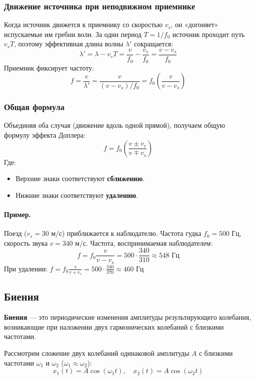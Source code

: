 \subsubsection{Движение источника при неподвижном приемнике}

Когда источник движется к приемнику со скоростью $v_s$, он «догоняет» испускаемые им гребни волн. За один период $T = 1/f_0$ источник проходит путь $v_s T$, поэтому эффективная длина волны $\lambda'$ сокращается:
\[
\lambda' = \lambda - v_s T = \frac{v}{f_0} - \frac{v_s}{f_0} = \frac{v - v_s}{f_0}
\]
Приемник фиксирует частоту:
\[
f = \frac{v}{\lambda'} = \frac{v}{(v - v_s)/f_0} = f_0 \left( \frac{v}{v - v_s} \right)
\]

\subsubsection{Общая формула}
Объединяя оба случая (движение вдоль одной прямой), получаем общую формулу эффекта Доплера:
\[
f = f_0 \left( \frac{v \pm v_r}{v \mp v_s} \right)
\]
Где:
\begin{itemize}
    \item Верхние знаки соответствуют \textbf{сближению}.
    \item Нижние знаки соответствуют \textbf{удалению}.
\end{itemize}

\paragraph*{Пример.}
Поезд (\(v_s = 30\) м/с) приближается к наблюдателю. Частота гудка \(f_0 = 500\) Гц, скорость звука \(v = 340\) м/с. Частота, воспринимаемая наблюдателем:
\[
f = f_0 \frac{v}{v-v_s} = 500 \cdot \frac{340}{310} \approx 548 \text{ Гц}
\]
При удалении: \(f = f_0 \frac{v}{v+v_s} = 500 \cdot \frac{340}{370} \approx 460 \text{ Гц}\)

\subsection{Биения}

\textbf{Биения} — это периодические изменения амплитуды результирующего колебания, возникающие при наложении двух гармонических колебаний с близкими частотами.

Рассмотрим сложение двух колебаний одинаковой амплитуды $A$ с близкими частотами $\omega_1$ и $\omega_2$ ($\omega_1 \approx \omega_2$):
\[
x_1(t) = A \cos(\omega_1 t), \quad x_2(t) = A \cos(\omega_2 t)
\]

